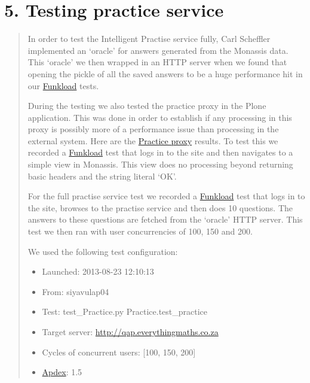 \documentclass[letterpaper,10pt,english]{sphinxmanual}
\begin{document}
\chapter{5. Testing practice service}
\label{index:testing-practice-service}\begin{quote}

In order to test the Intelligent Practise service fully, Carl Scheffler
implemented an `oracle' for answers generated from the Monassis data.
This `oracle' we then wrapped in an HTTP server when we found that opening
the pickle of all the saved answers to be a huge performance hit in our
\href{http://funkload.nuxeo.org}{Funkload} tests.

During the testing we also tested the practice proxy in the Plone
application.  This was done in order to establish if any processing in this
proxy is possibly more of a performance issue than processing in the
external system.  Here are the \href{http://197.221.50.101/stats/test\_practiceproxy-20130819T124350/}{Practice proxy} results.  To test this we
recorded a \href{http://funkload.nuxeo.org}{Funkload} test that logs in to the site and then navigates to a
simple view in Monassis.  This view does no processing beyond returning
basic headers and the string literal `OK'.

For the full practise service test we recorded a \href{http://funkload.nuxeo.org}{Funkload} test that logs in
to the site, browses to the practise service and then does 10 questions.
The answers to these questions are fetched from the `oracle' HTTP server.
This test we then ran with user concurrencies of 100, 150 and 200.

We used the following test configuration:
\begin{itemize}
\item {} 
Launched: 2013-08-23 12:10:13

\item {} 
From: siyavulap04

\item {} 
Test: test\_Practice.py Practice.test\_practice

\item {} 
Target server: \href{http://qap.everythingmaths.co.za}{http://qap.everythingmaths.co.za}

\item {} 
Cycles of concurrent users: {[}100, 150, 200{]}

\item {} 
\href{http://apdex.org/}{Apdex}: 1.5

\end{itemize}
\end{quote}
\end{document}

